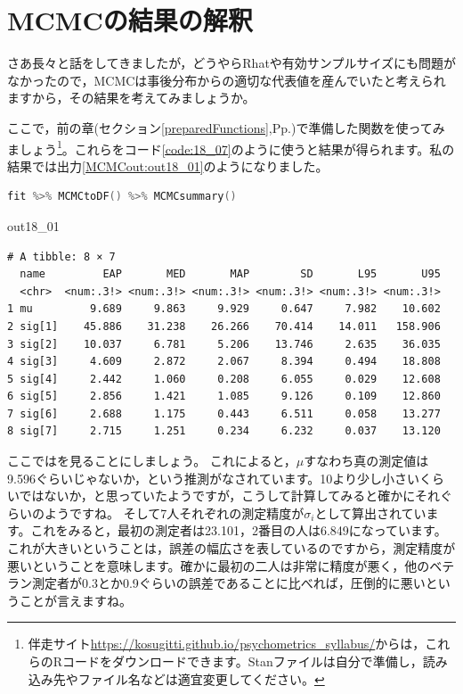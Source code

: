 \documentclass{ltjsbook}
\begin{document}
\section{MCMCの結果の解釈}
さあ長々と話をしてきましたが，どうやらRhatや有効サンプルサイズにも問題がなかったので，MCMCは事後分布からの適切な代表値を産んでいたと考えられますから，その結果を考えてみましょうか。

ここで，前の章(セクション\ref{preparedFunctions},Pp.\pageref{preparedFunctions})で準備した関数を使ってみましょう\footnote{伴走サイト\url{https://kosugitti.github.io/psychometrics_syllabus/}からは，これらのRコードをダウンロードできます。Stanファイルは自分で準備し，読み込み先やファイル名などは適宜変更してください。}。これらをコード\ref{code:18_07}のように使うと結果が得られます。私の結果では出力\ref{MCMCout:out18_01}のようになりました。

\begin{lstlisting}[language=C++,label={code:18_07},caption={stanの結果を準備し関数に与える}]
fit %>% MCMCtoDF() %>% MCMCsummary()
\end{lstlisting}

\begin{MCMCout}{}{out18_01}
	\begin{verbatim}
# A tibble: 8 × 7
  name         EAP       MED       MAP        SD       L95       U95
  <chr>  <num:.3!> <num:.3!> <num:.3!> <num:.3!> <num:.3!> <num:.3!>
1 mu         9.689     9.863     9.929     0.647     7.982    10.602
2 sig[1]    45.886    31.238    26.266    70.414    14.011   158.906
3 sig[2]    10.037     6.781     5.206    13.746     2.635    36.035
4 sig[3]     4.609     2.872     2.067     8.394     0.494    18.808
5 sig[4]     2.442     1.060     0.208     6.055     0.029    12.608
6 sig[5]     2.856     1.421     1.085     9.126     0.109    12.860
7 sig[6]     2.688     1.175     0.443     6.511     0.058    13.277
8 sig[7]     2.715     1.251     0.234     6.232     0.037    13.120
\end{verbatim}
\end{MCMCout}

ここではを見ることにしましょう。
これによると，$\mu$すなわち真の測定値は9.596ぐらいじゃないか，という推測がなされています。10より少し小さいくらいではないか，と思っていたようですが，こうして計算してみると確かにそれぐらいのようですね。
そして7人それぞれの測定精度が$\sigma_i$として算出されています。これをみると，最初の測定者は23.101，2番目の人は6.849になっています。これが大きいということは，誤差の幅広さを表しているのですから，測定精度が悪いということを意味します。確かに最初の二人は非常に精度が悪く，他のベテラン測定者が0.3とか0.9ぐらいの誤差であることに比べれば，圧倒的に悪いということが言えますね。
\end{document}
